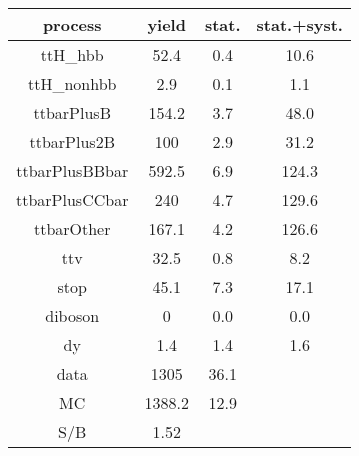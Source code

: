 \begin{tabular}{cccc}
\hline
    process     &  yield  &  stat.  &  stat.+syst.  \\
\hline
    ttH\_hbb     &  52.4   &   0.4   &     10.6      \\
   ttH\_nonhbb   &   2.9   &   0.1   &      1.1      \\
   ttbarPlusB   &  154.2  &   3.7   &     48.0      \\
  ttbarPlus2B   &   100   &   2.9   &     31.2      \\
 ttbarPlusBBbar &  592.5  &   6.9   &     124.3     \\
 ttbarPlusCCbar &   240   &   4.7   &     129.6     \\
   ttbarOther   &  167.1  &   4.2   &     126.6     \\
      ttv       &  32.5   &   0.8   &      8.2      \\
      stop      &  45.1   &   7.3   &     17.1      \\
    diboson     &    0    &   0.0   &      0.0      \\
       dy       &   1.4   &   1.4   &      1.6      \\
\hline
      data      &  1305   &  36.1   &               \\
       MC       & 1388.2  &  12.9   &               \\
\hline
      S/B       &  1.52   &         &               \\
\hline
\end{tabular}
